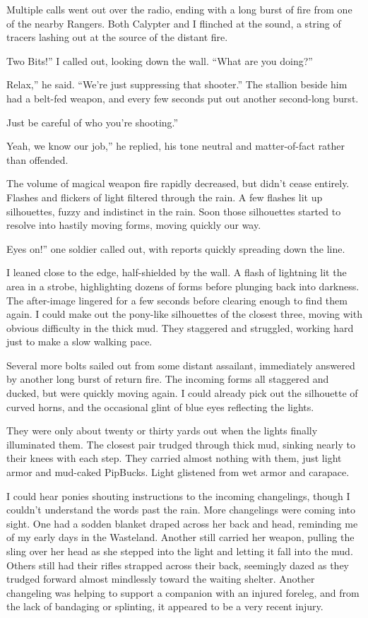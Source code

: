Multiple calls went out over the radio, ending with a long burst of fire from one of the nearby Rangers. Both Calypter and I flinched at the sound, a string of tracers lashing out at the source of the distant fire.

\leavevmode{}Two Bits!” I called out, looking down the wall. “What are you doing?”

\leavevmode{}Relax,” he said. “We’re just suppressing that shooter.” The stallion beside him had a belt-fed weapon, and every few seconds put out another second-long burst.

\leavevmode{}Just be careful of who you’re shooting.”

\leavevmode{}Yeah, we know our job,” he replied, his tone neutral and matter-of-fact rather than offended.

The volume of magical weapon fire rapidly decreased, but didn’t cease entirely. Flashes and flickers of light filtered through the rain. A few flashes lit up silhouettes, fuzzy and indistinct in the rain. Soon those silhouettes started to resolve into hastily moving forms, moving quickly our way.

\leavevmode{}Eyes on!” one soldier called out, with reports quickly spreading down the line.

I leaned close to the edge, half-shielded by the wall. A flash of lightning lit the area in a strobe, highlighting dozens of forms before plunging back into darkness. The after-image lingered for a few seconds before clearing enough to find them again. I could make out the pony-like silhouettes of the closest three, moving with obvious difficulty in the thick mud. They staggered and struggled, working hard just to make a slow walking pace.

Several more bolts sailed out from some distant assailant, immediately answered by another long burst of return fire. The incoming forms all staggered and ducked, but were quickly moving again. I could already pick out the silhouette of curved horns, and the occasional glint of blue eyes reflecting the lights.

They were only about twenty or thirty yards out when the lights finally illuminated them. The closest pair trudged through thick mud, sinking nearly to their knees with each step. They carried almost nothing with them, just light armor and mud-caked PipBucks. Light glistened from wet armor and carapace.

I could hear ponies shouting instructions to the incoming changelings, though I couldn’t understand the words past the rain. More changelings were coming into sight. One had a sodden blanket draped across her back and head, reminding me of my early days in the Wasteland. Another still carried her weapon, pulling the sling over her head as she stepped into the light and letting it fall into the mud. Others still had their rifles strapped across their back, seemingly dazed as they trudged forward almost mindlessly toward the waiting shelter. Another changeling was helping to support a companion with an injured foreleg, and from the lack of bandaging or splinting, it appeared to be a very recent injury.

